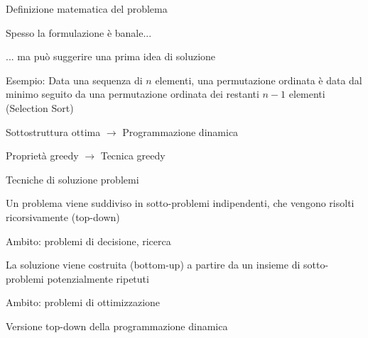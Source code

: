 \begin{frame}{Definizione matematica del problema}

	\BIL
	\item Spesso la formulazione è banale...
	\item ... ma può suggerire una prima idea di soluzione
	\item Esempio: Data una sequenza di $n$ elementi, una permutazione ordinata 
	è data dal minimo seguito da una permutazione ordinata dei restanti $n-1$ elementi
	(Selection Sort)
	\EIL
	
\medskip
{}
	\BIL
	\item \alert{Sottostruttura ottima} $\rightarrow$ \alert{Programmazione dinamica}
	\item \alert{Proprietà greedy} $\rightarrow$ \alert{Tecnica greedy}
	\EIL



\end{frame}


\begin{frame}{Tecniche di soluzione problemi}

\begin{myboxtitle}
\BI
\item Un problema viene suddiviso in sotto-problemi indipendenti, che vengono
risolti ricorsivamente (top-down)
\item Ambito: problemi di decisione, ricerca
\EI
\end{myboxtitle}

\begin{myboxtitle}
\BI
\item La soluzione viene costruita (bottom-up) a partire da un insieme di
sotto-problemi potenzialmente ripetuti
\item Ambito: problemi di ottimizzazione
\EI
\end{myboxtitle}
\begin{myboxtitle}
\BI
\item Versione top-down della programmazione dinamica
\EI
\end{myboxtitle}


\end{frame}

